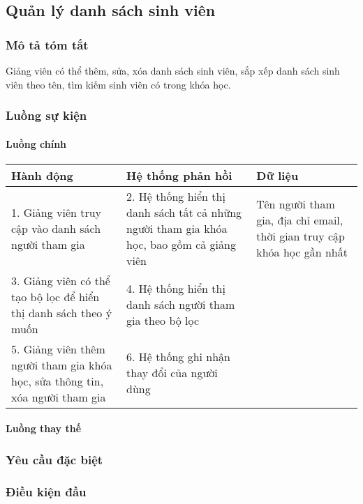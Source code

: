 \documentclass[./../main_file.tex]{subfiles}
\begin{document}
\subsection{Quản lý danh sách sinh viên}
\subsubsection{Mô tả tóm tắt}
Giảng viên có thể thêm, sửa, xóa danh sách sinh viên, sắp xếp danh sách sinh viên theo tên, tìm kiếm sinh viên có trong khóa học.

\subsubsection{Luồng sự kiện}
\paragraph{Luồng chính}
\begin{table}[H]
				\begin{tabular}{|p{.33\textwidth}|p{}|p{}|}
		\hline
		\textbf{Hành động}                                                         & \textbf{Hệ thống phản hồi}                             & \textbf{Dữ liệu} \\ \hline
		1. Giảng viên truy cập vào danh sách người tham gia &
		2. Hệ thống hiển thị danh sách tất cả những người tham gia khóa học, bao gồm cả giảng viên &
		Tên người tham gia, địa chỉ email, thời gian truy cập khóa học gần nhất \\ \hline
		3. Giảng viên có thể tạo bộ lọc để hiển thị danh sách theo ý muốn             & 4. Hệ thống hiển thị danh sách người tham gia theo bộ lọc &                  \\ \hline
		5. Giảng viên thêm người tham gia khóa học, sửa thông tin, xóa người tham gia & 6. Hệ thống ghi nhận thay đổi của người dùng              &                  \\ \hline
	\end{tabular}
\end{table}
\paragraph{Luồng thay thế}
\subsubsection{Yêu cầu đặc biệt}
\subsubsection{Điều kiện đầu}
\end{document}
